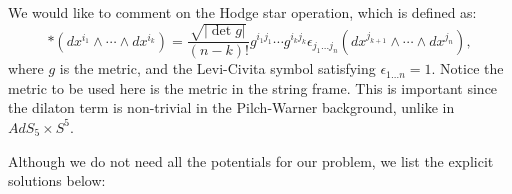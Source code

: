 We would like to comment on the Hodge star operation, which is defined as:
\begin{equation}
 \ast (dx^{i_1} \wedge \cdots \wedge dx^{i_k} ) = 
 \dfrac{\sqrt{|\det g|}}{(n-k)!} g^{i_1 j_1} \cdots g^{i_k j_k} \epsilon_{j_1 \ldots j_n} (dx^{j_{k+1}} \wedge \cdots \wedge dx^{j_n} ),
\end{equation}
where $g$ is the metric, and the Levi-Civita symbol satisfying $\epsilon_{1 \ldots n}=1$.
Notice the metric to be used here is the metric in the string frame. This is important since the dilaton term is non-trivial in the Pilch-Warner background, unlike in $AdS_5 \times S^5$. 

Although we do not need all the potentials for our problem, we list the explicit solutions below:



